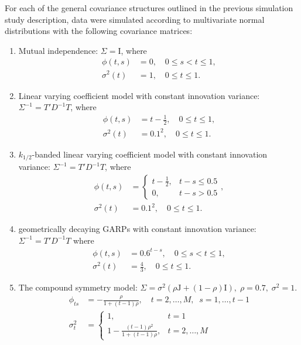 
For each of the general covariance structures outlined in the previous simulation study description, data were simulated according to multivariate normal distributions with the following covariance matrices: 
\begin{enumerate} \label{simulation-model-list}
\item\label{item:cov-type-1} Mutual independence: $\Sigma = \mathrm{I}$, where 
\begin{align*}
\phi\left(t,s\right) &= 0, \quad 0 \le s < t \le 1,\\ 
\sigma^2\left(t\right) &= 1, \quad 0 \le t \le 1.
\end{align*}
\item \label{item:cov-type-2} Linear varying coefficient model with constant innovation variance: $\Sigma^{-1} = T' D^{-1} T$, where 
\begin{align*}
\phi\left(t,s\right) &= t - \frac{1}{2},  \quad 0 \le t \le 1, \\
\sigma^2\left(t\right) &= 0.1^2,  \quad 0 \le t \le 1.
\end{align*}
{}
\item \label{item:cov-type-3} $k_{1/2}$-banded linear varying coefficient model with constant innovation variance: $\Sigma^{-1} = T' D^{-1} T$, where
\begin{align*}
\phi\left(t,s\right) &= \left\{\begin{array}{ll} t - \frac{1}{2}, & t - s \le 0.5\\ 
0, & t - s > 0.5\end{array}\right.,\\
\sigma^2\left(t\right) &= 0.1^2, \quad 0 \le t \le 1.
\end{align*}
\item \label{item:cov-type-4} geometrically decaying GARPs with constant innovation variance: $\Sigma^{-1} = T' D^{-1} T$ where 
\begin{align*}
\phi\left(t,s\right) &= 0.6^{t - s}, \quad 0 \le s < t \le 1,\\
\sigma^2\left(t\right) &= \frac{4}{3}, \quad 0 \le t \le 1.
\end{align*}
\item \label{item:cov-type-5} The compound symmetry model: $\Sigma = \sigma^2\left(\rho \mathrm{J} + \left(1-\rho\right)\mathrm{I}\right),\; \rho=0.7,\;\sigma^2=1$. 
\begin{align*}
\phi_{ts} &= -\frac{\rho}{1 + \left(t-1\right)\rho}, \quad t = 2, \dots, M,\;\; s = 1, \dots, t-1\\
\sigma_t^2 &= \left\{\begin{array}{ll} 1, & t = 1\\ 1 -\frac{\left(t-1\right)\rho^2}{1 + \left(t-1\right)\rho}, & t = 2, \dots, M \end{array}\right.
\end{align*}
\end{enumerate}
 




